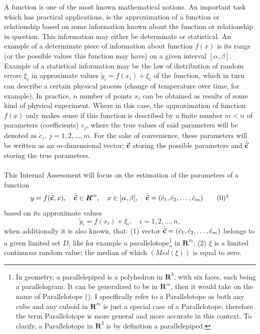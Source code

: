 A function is one of the most known mathematical notions. An important task which has practical applications, is the approximation of a function or relationship based on some information known about the function or relationship in question. This information may either be determinate or statistical. An example of a determinate piece of information about function $f(x)$ is its range (or the possible values this function may have) on a given interval $[\alpha,\beta]$. Example of a statistical information may be the law of distribution of random errors $\xi_{i}$ in approximate values $\tilde{y}_{i} = f(x_{i})+\xi_{i}$ of the function, which in turn can describe a certain physical process (change of temperature over time, for example). In practice,  $n$ number of points $x_{i}$ can be obtained as results of some kind of physical experiment. Where in this case, the approximation of function $f(x)$ only makes sense if this function is described by a finite number $m<n$ of parameters (coefficients) $c_{j}$, where the true values of said parameters will be denoted as $\dot{c}_{j}, \ j=1,2,\dots,m.$ For the sake of convenience, these parameters will be written as an $m$-dimensional vector; $\vec{\textbf{c}}$ storing the possible parameters and $\dot{\vec{\textbf{c}}}$ storing the true parameters. \\
\\
This Internal Assessment will focus on the estimation of the parameters of a function 
\begin{equation} 
y = f(\dot{\vec{\textbf{c}}},x),\quad \dot{\vec{\textbf{c}}} \in \boldsymbol{R}^{m},\quad x \in [\alpha,\beta],\quad \dot{\vec{\textbf{c}}} = (\dot{c}_{1}, \dot{c}_{2},\dots,\dot{c}_{m}) \label{301} \tag*{(\theequation)\protect\footnotemark}
\end{equation}
based on its approximate values
\begin{equation}
\tilde{y}_{i} = f(x_{i})+\xi_{i}, \quad i=1,2,\dots,n ,
\end{equation}
when additionally it is also known, that: (1) vector $\dot{\vec{\textbf{c}}} = (\dot{c}_{1}, \dot{c}_{2},\dots,\dot{c}_{m})$ belongs to a given limited set $D$, like for example a parallelotope\footnote{In geometry, a parallelepiped is a polyhedron in $\boldsymbol{R}^3$, with six faces, each being a parallelogram. It can be generalized to be in $\boldsymbol{R}^m$, then it would take on the name of Parallelotope (\cite{coxeter_1973}). I specifically refer to a Parallelotope as both any cube and any cuboid in $\boldsymbol{R}^m$ is just a special case of a Parallelotope, therefore the term Parallelotope is more general and more accurate in this context. To clarify, a Parallelotope in $\boldsymbol{R}^{3}$ is by definition a parallelepiped.} in $\boldsymbol{R}^{m}$; (2) $\xi$ is a limited continuous random value; the median of which $(Med(\xi))$ is equal to zero. \\
